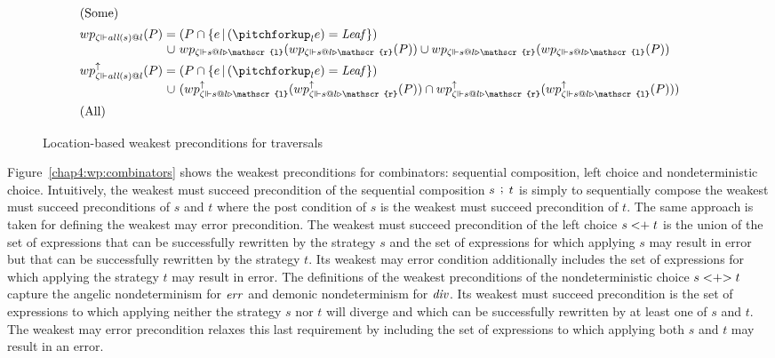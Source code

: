 \begin{figure}[!b]
\begin{align*}
\begin{array}{@{}l@{\;}c@{\;}l}
    \end{array}
    \\\intertext{\centering(Some)}
    &\begin{array}{@{}l@{\;}c@{\;}l}wp_{\zeta \Vdash \mathit{all}(s) @ l}(P)
    &=& (P \cap \{e \barr (\pitchforkup_l e) = \mathit{Leaf}\})
    \\&\cup& wp_{\zeta \Vdash s@l\triangleright \mathscr{l}}(wp_{\zeta \Vdash s@l \triangleright \mathscr{r}}(P)) \cup wp_{\zeta \Vdash s@l\triangleright \mathscr{r}} (wp_{\zeta \Vdash s@l \triangleright \mathscr{l}}(P))\end{array}
    \\
    &\begin{array}{@{}l@{\;}c@{\;}l}wp_{\zeta \Vdash \mathit{all}(s) @ l} ^ \uparrow(P) &=& (P \cap \{e \barr (\pitchforkup_l e) = \mathit{Leaf}\})
    \\&\cup& (wp_{\zeta \Vdash s@l\triangleright \mathscr{l}} ^\uparrow (wp_{\zeta \Vdash s@l \triangleright \mathscr{r}} ^ \uparrow(P)) \cap wp_{\zeta \Vdash s@l\triangleright \mathscr{r}} ^\uparrow (wp_{\zeta \Vdash s@l \triangleright \mathscr{l}} ^ \uparrow(P)))
    \end{array}
    \\\intertext{\centering(All)}
\end{align*}
    \vspace{-3em}
    \caption{Location-based weakest preconditions for traversals}
    \label{wp:traversals}
\end{figure}
Figure~\ref{chap4:wp:combinators} shows the weakest preconditions for combinators: sequential composition, left choice and nondeterministic choice. 
Intuitively, the weakest must succeed precondition of the sequential composition $s \, \mathrel{\mathop;} \, t$ is simply to sequentially compose the weakest must succeed preconditions of $s$ and $t$ where the post condition of $s$ is the weakest must succeed precondition of $t$. The same approach is taken for defining the weakest may error precondition. The weakest must succeed precondition of the left choice $s <\mathrel{\mathop+} t$ is the union of the set of expressions that can be successfully rewritten by the strategy $s$ and the set of expressions for which applying $s$ may result in error but that can be successfully rewritten by the strategy $t$. Its weakest may error condition additionally includes the set of expressions for which applying the strategy $t$ may result in error. The definitions of the weakest preconditions of the nondeterministic choice $s <\mathrel{\mathop+}\mathrel{\mathop>} t$ capture the angelic nondeterminism for $\mathit{err}$ and demonic nondeterminism for $\mathit{div}$. Its weakest must succeed precondition is the set of expressions to which applying neither the strategy $s$ nor $t$ will diverge and which can be successfully rewritten by at least one of $s$ and $t$. The weakest may error precondition relaxes this last requirement by including the set of expressions to which applying both $s$ and $t$ may result in an error.

